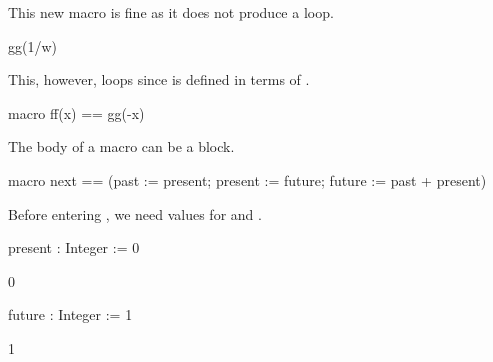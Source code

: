 \begin{xtc}
\begin{xtccomment}
This new macro is fine as it does not produce a loop.
\end{xtccomment}
\begin{spadsrc}
gg(1/w) 
\end{spadsrc}
\begin{TeXOutput}
\begin{fricasmath}{6}
%
\end{fricasmath}
\end{TeXOutput}
\end{xtc}
%
\begin{xtc}
\begin{xtccomment}
This, however, loops since  is
defined in terms of .
\end{xtccomment}
\begin{spadsrc}
macro ff(x) == gg(-x) 
\end{spadsrc}
\end{xtc}
\begin{xtc}
\begin{xtccomment}
The body of a macro can be a block.
\end{xtccomment}
\begin{spadsrc}
macro next == (past := present; present := future; future := past + present) 
\end{spadsrc}
\end{xtc}
\begin{xtc}
\begin{xtccomment}
Before entering , we need
values for  and .
\end{xtccomment}
\begin{spadsrc}
present : Integer := 0 
\end{spadsrc}
\begin{TeXOutput}
\begin{fricasmath}{9}
0%
\end{fricasmath}
\end{TeXOutput}
\end{xtc}
\begin{xtc}
\begin{xtccomment}
\end{xtccomment}
\begin{spadsrc}
future : Integer := 1 
\end{spadsrc}
\begin{TeXOutput}
\begin{fricasmath}{10}
1%
\end{fricasmath}
\end{TeXOutput}
\end{xtc}
